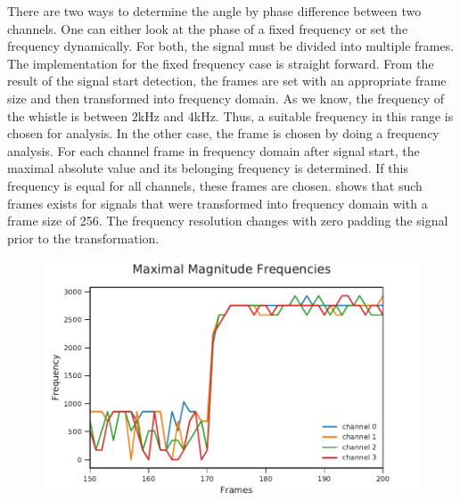 There are two ways to determine the angle by phase difference
between two channels.
One can either look at the phase of a fixed frequency or set the frequency
dynamically.
For both, the signal must be divided into multiple frames.
The implementation for the fixed frequency case is straight forward.
From the result of the signal start detection, the frames
are set with an appropriate frame size and then transformed into
frequency domain.
As we know, the frequency of the whistle is between 2\si{\kilo\hertz}
and 4\si{\kilo\hertz}.
Thus, a suitable frequency in this range is chosen for analysis.
In the other case, the frame is chosen by doing a
frequency analysis.
For each channel frame in frequency domain after signal start,
the maximal absolute value and its belonging frequency is determined.
If this frequency is equal for all channels, these frames
are chosen.
 shows that such frames exists for signals that
were transformed into frequency domain with a frame size of 256.
The frequency resolution changes with zero padding the signal prior
to the transformation.
\begin{figure}[ht]
	\centering
		\includegraphics[]{figures/maxFreq}
	\caption{}
    \label{fig:03_maxFreq}
\end{figure}

